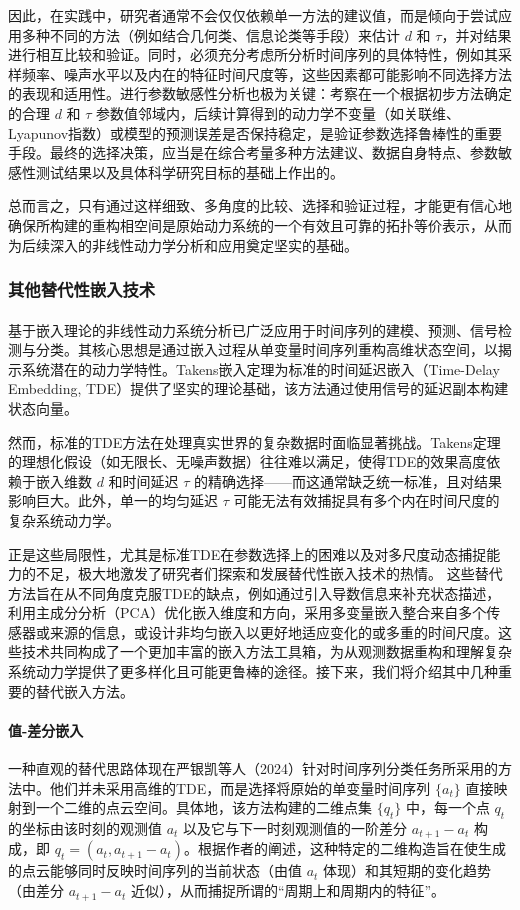 因此，在实践中，研究者通常不会仅仅依赖单一方法的建议值，而是倾向于尝试应用多种不同的方法（例如结合几何类、信息论类等手段）来估计 $d$ 和 $\tau$，并对结果进行相互比较和验证。同时，必须充分考虑所分析时间序列的具体特性，例如其采样频率、噪声水平以及内在的特征时间尺度等，这些因素都可能影响不同选择方法的表现和适用性。进行参数敏感性分析也极为关键：考察在一个根据初步方法确定的合理 $d$ 和 $\tau$ 参数值邻域内，后续计算得到的动力学不变量（如关联维、Lyapunov指数）或模型的预测误差是否保持稳定，是验证参数选择鲁棒性的重要手段。最终的选择决策，应当是在综合考量多种方法建议、数据自身特点、参数敏感性测试结果以及具体科学研究目标的基础上作出的。

总而言之，只有通过这样细致、多角度的比较、选择和验证过程，才能更有信心地确保所构建的重构相空间是原始动力系统的一个有效且可靠的拓扑等价表示，从而为后续深入的非线性动力学分析和应用奠定坚实的基础。

\subsubsection{其他替代性嵌入技术} %
\paragraph{} %
基于嵌入理论的非线性动力系统分析已广泛应用于时间序列的建模、预测、信号检测与分类。其核心思想是通过嵌入过程从单变量时间序列重构高维状态空间，以揭示系统潜在的动力学特性。Takens嵌入定理为标准的时间延迟嵌入（Time-Delay Embedding, TDE）提供了坚实的理论基础，该方法通过使用信号的延迟副本构建状态向量。

然而，标准的TDE方法在处理真实世界的复杂数据时面临显著挑战。Takens定理的理想化假设（如无限长、无噪声数据）往往难以满足，使得TDE的效果高度依赖于嵌入维数 $d$ 和时间延迟 $\tau$ 的精确选择——而这通常缺乏统一标准，且对结果影响巨大。此外，单一的均匀延迟 $\tau$ 可能无法有效捕捉具有多个内在时间尺度的复杂系统动力学。

正是这些局限性，尤其是标准TDE在参数选择上的困难以及对多尺度动态捕捉能力的不足，极大地激发了研究者们探索和发展替代性嵌入技术的热情。 这些替代方法旨在从不同角度克服TDE的缺点，例如通过引入导数信息来补充状态描述，利用主成分分析（PCA）优化嵌入维度和方向，采用多变量嵌入整合来自多个传感器或来源的信息，或设计非均匀嵌入以更好地适应变化的或多重的时间尺度。这些技术共同构成了一个更加丰富的嵌入方法工具箱，为从观测数据重构和理解复杂系统动力学提供了更多样化且可能更鲁棒的途径。接下来，我们将介绍其中几种重要的替代嵌入方法。

\paragraph{值-差分嵌入} %
一种直观的替代思路体现在严银凯等人（2024）针对时间序列分类任务所采用的方法中。他们并未采用高维的TDE，而是选择将原始的单变量时间序列 $\{a_t\}$ 直接映射到一个二维的点云空间。具体地，该方法构建的二维点集 $\{q_t\}$ 中，每一个点 $q_t$ 的坐标由该时刻的观测值 $a_t$ 以及它与下一时刻观测值的一阶差分 $a_{t+1}-a_t$ 构成，即 $q_t = (a_t, a_{t+1}-a_t)$。根据作者的阐述，这种特定的二维构造旨在使生成的点云能够同时反映时间序列的当前状态（由值 $a_t$ 体现）和其短期的变化趋势（由差分 $a_{t+1}-a_t$ 近似），从而捕捉所谓的“周期上和周期内的特征”。

